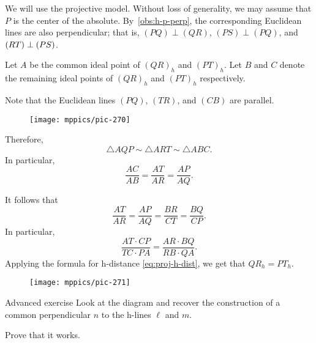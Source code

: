 We will use the projective model.
Without loss of generality, we may assume that $P$ is the center of the absolute.
By~\ref{obs:h-p-perp},
the corresponding Euclidean lines are also perpendicular;
that is, $(PQ)\perp (QR)$, $(PS)\perp(PQ)$, and $(RT)\perp (PS)$.

Let $A$ be the common ideal point of $(QR)_h$ and $(PT)_h$.
Let $B$ and $C$ denote the remaining ideal points of $(QR)_h$ and $(PT)_h$ respectively.

Note that the Euclidean lines $(PQ)$, $(TR)$, and $(CB)$ are parallel.

\begin{wrapfigure}{o}{55mm}
\vskip-0mm
\centering
\texttt{[image: mppics/pic-270]}
\vskip2mm
\end{wrapfigure}

Therefore, 
\[\triangle AQP\sim \triangle ART \sim\triangle ABC.\]
In particular,
\[\frac{AC}{AB}=\frac{AT}{AR}=\frac{AP}{AQ}.\]

It follows that
\[\frac{AT}{AR}=\frac{AP}{AQ}=\frac{BR}{CT}=\frac{BQ}{CP}.\]
In particular, 
\[\frac{AT\cdot CP}{TC\cdot PA}=\frac{AR\cdot BQ}{RB\cdot QA}.\]
Applying the formula for h-distance \ref{eq:proj-h-dist}, we get that $QR_h=PT_h$.
\qeds

\begin{wrapfigure}{r}{35mm}
\vskip-6mm
\centering
\texttt{[image: mppics/pic-271]}
\vskip2mm
\end{wrapfigure}

\begin{thm}{Advanced exercise}\label{ex:common-perp}
Look at the diagram and
recover the construction of a common perpendicular $n$ to the h-lines $\ell$ and $m$.

Prove that it works.
\end{thm}
